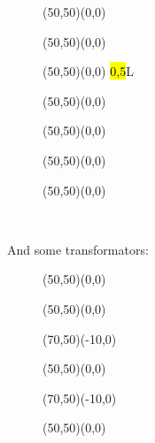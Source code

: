 	\begin{figure}[H]
		\begin{center}
		\begin{picture}(50,50)(0,0)
		\end{picture}
		\begin{picture}(50,50)(0,0)
		\end{picture}
		\begin{picture}(50,50)(0,0)
		\hl{0,5}{L}
		\end{picture}
		\begin{picture}(50,50)(0,0)
		\end{picture}
		\begin{picture}(50,50)(0,0)
		\end{picture}
		\begin{picture}(50,50)(0,0)
		\end{picture}
		\begin{picture}(50,50)(0,0)
		\end{picture}
		\\[2cm]
		\end{center}
	\end{figure}
	
	And some transformators:	
	\begin{figure}[H]
		\vspace{1cm}
		\begin{center}
		\begin{picture}(50,50)(0,0)
		\end{picture}
		\begin{picture}(50,50)(0,0)
		\end{picture}
		\begin{picture}(70,50)(-10,0)
		\end{picture}
		\begin{picture}(50,50)(0,0)
		\end{picture}
		\begin{picture}(70,50)(-10,0)
		\end{picture}
		\begin{picture}(50,50)(0,0)
		\end{picture}\hfill\\[1cm]
		\end{center}
	\end{figure}
	

